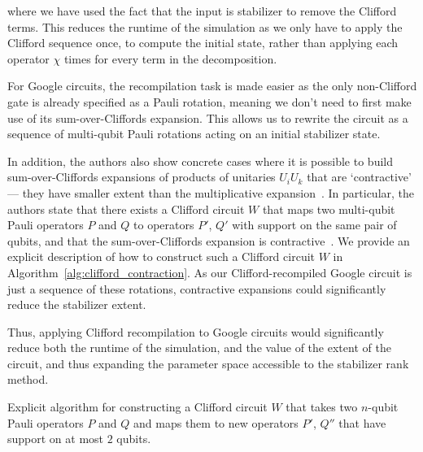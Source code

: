 where we have used the fact that the input is stabilizer to remove the Clifford terms.
This reduces the runtime of the simulation as we only have to apply the Clifford sequence once, to compute the initial state, rather than applying each operator $\chi$ times for every term in the decomposition.\par
For Google circuits, the recompilation task is made easier as the only non-Clifford gate is already specified as a Pauli rotation, meaning we don't need to first make use of its sum-over-Cliffords expansion. This allows us to rewrite the circuit as a sequence of multi-qubit Pauli rotations acting on an initial stabilizer state.\par
In addition, the authors also show concrete cases where it is possible to build sum-over-Cliffords expansions of products of unitaries $U_{i}U_{k}$ that are `contractive' --- they have smaller extent than the multiplicative expansion~\cite{Qassim2019}. In particular, the authors state that there exists a Clifford circuit $W$ that maps two multi-qubit Pauli operators $P$ and $Q$ to operators $P'$, $Q'$ with support on the same pair of qubits, and that the sum-over-Cliffords expansion is contractive~\cite{Qassim2019}. We provide an explicit description of how to construct such a Clifford circuit $W$ in Algorithm~\ref{alg:clifford_contraction}. As our Clifford-recompiled Google circuit is just a sequence of these rotations, contractive expansions could significantly reduce the stabilizer extent.\par
Thus, applying Clifford recompilation to Google circuits would significantly reduce both the runtime of the simulation, and the value of the extent of the circuit, and thus expanding the parameter space accessible to the stabilizer rank method.
\begin{algorithm}[b]
\begin{algorithmic}
\EndFor
{}
\EndFor
{}
\EndFor
{}
\EndFor
{}
\end{algorithmic}
\caption{Explicit algorithm for constructing a Clifford circuit $W$ that takes two $n$-qubit Pauli operators $P$ and $Q$ and maps them to new operators $P'$, $Q''$ that have support on at most $2$ qubits.}\label{alg:clifford_contraction}
\end{algorithm}

